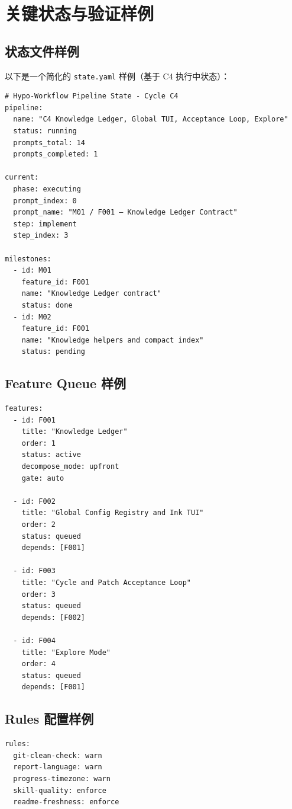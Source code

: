 \documentclass[
  outputdir=build,
  chapterstyle=cn,
  colorscheme=Simple,
  fontset=tech,
  code=false
]{Hypo-Note}
\begin{document}
\chapter{关键状态与验证样例}

\section{状态文件样例}

以下是一个简化的 \texttt{state.yaml} 样例（基于 C4 执行中状态）：

\begin{lstlisting}[caption=state.yaml 样例]
# Hypo-Workflow Pipeline State - Cycle C4
pipeline:
  name: "C4 Knowledge Ledger, Global TUI, Acceptance Loop, Explore"
  status: running
  prompts_total: 14
  prompts_completed: 1

current:
  phase: executing
  prompt_index: 0
  prompt_name: "M01 / F001 — Knowledge Ledger Contract"
  step: implement
  step_index: 3

milestones:
  - id: M01
    feature_id: F001
    name: "Knowledge Ledger contract"
    status: done
  - id: M02
    feature_id: F001
    name: "Knowledge helpers and compact index"
    status: pending
\end{lstlisting}

\section{Feature Queue 样例}

\begin{lstlisting}[caption=feature-queue.yaml 样例（C4）]
features:
  - id: F001
    title: "Knowledge Ledger"
    order: 1
    status: active
    decompose_mode: upfront
    gate: auto

  - id: F002
    title: "Global Config Registry and Ink TUI"
    order: 2
    status: queued
    depends: [F001]

  - id: F003
    title: "Cycle and Patch Acceptance Loop"
    order: 3
    status: queued
    depends: [F002]

  - id: F004
    title: "Explore Mode"
    order: 4
    status: queued
    depends: [F001]
\end{lstlisting}

\section{Rules 配置样例}

\begin{lstlisting}[caption=rules.yaml 样例]
rules:
  git-clean-check: warn
  report-language: warn
  progress-timezone: warn
  skill-quality: enforce
  readme-freshness: enforce
\end{lstlisting}
\end{document}
